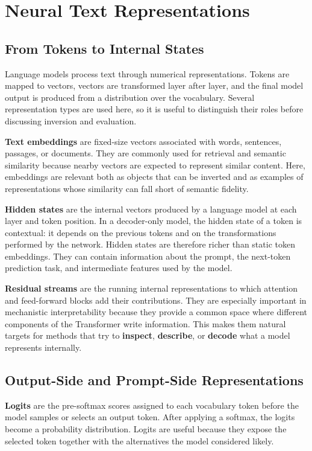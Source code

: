\documentclass[12pt,a4paper,twoside,openright]{book}
\begin{document}
\section{Neural Text Representations}

\subsection{From Tokens to Internal States}

Language models process text through numerical representations. Tokens are
mapped to vectors, vectors are transformed layer after layer, and the final
model output is produced from a distribution over the vocabulary. Several
representation types are used here, so it is useful to distinguish their roles
before discussing inversion and evaluation.

\textbf{Text embeddings} are fixed-size vectors associated with words,
sentences, passages, or documents. They are commonly used for retrieval and
semantic similarity because nearby vectors are expected to represent similar
content. Here, embeddings are relevant both as objects that can be
inverted and as examples of representations whose similarity can fall short of
semantic fidelity.

\textbf{Hidden states} are the internal vectors produced by a language model at
each layer and token position. In a decoder-only model, the hidden state of a
token is contextual: it depends on the previous tokens and on the transformations
performed by the network. Hidden states are therefore richer than static token
embeddings. They can contain information about the prompt, the next-token
prediction task, and intermediate features used by the model.

\textbf{Residual streams} are the running internal representations to which
attention and feed-forward blocks add their contributions. They are especially
important in mechanistic interpretability because they provide a common space
where different components of the Transformer write information. This makes
them natural targets for methods that try to \textbf{inspect}, \textbf{describe},
or \textbf{decode} what a model represents internally.

\subsection{Output-Side and Prompt-Side Representations}

\textbf{Logits} are the pre-softmax scores assigned to each vocabulary token
before the model samples or selects an output token. After applying a softmax,
the logits become a probability distribution. Logits are useful because they
expose the selected token together with the alternatives the model considered
likely.
\end{document}
